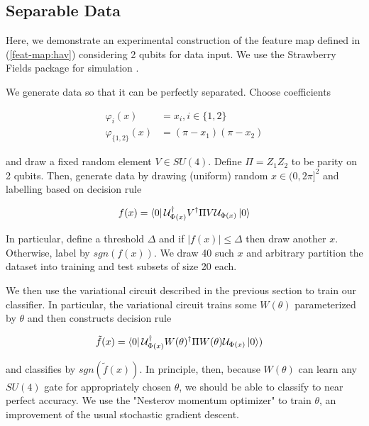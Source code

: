 \documentclass{beamer}
\newcommand\0{\mathbf{0}}
\newcommand\<{\langle}
\renewcommand\>{\rangle}
\renewcommand\phi{\varphi}
\begin{document}
\subsection{Separable Data}

\begin{frame}
Here, we demonstrate an experimental construction of the feature map defined in (\ref{feat-map:hav}) considering 2 qubits for data input. We use the Strawberry Fields package for simulation \cite{killoran2019strawberry}.

We generate data so that it can be perfectly separated. Choose coefficients

\begin{align*}
\phi_{i}(x) &= x_i, i \in \{1, 2\} \\
\phi_{\{1,2\}}(x) &= (\pi - x_1)(\pi - x_2) 
\end{align*}

and draw a fixed random element $V \in SU(4)$. Define $\Pi = Z_1Z_2$ to be parity on 2 qubits. Then, generate data by drawing (uniform) random $x \in (0, 2\pi]^2$ and labelling based on decision rule

\begin{align*}
f(x) = \bra{0} \mathcal{U}_{\Phi(x)}^\dag V^\dag \Pi V \mathcal{U}_{\Phi(x)}\ket{0}	 
\end{align*}

In particular, define a threshold $\Delta$ and if $|f(x)| \leq \Delta$ then draw another $x$. Otherwise, label by $sgn(f(x))$. We draw 40 such $x$ and arbitrary partition the dataset into training and test subsets of size 20 each.
\end{frame}

\begin{frame}
We then use the variational circuit described in the previous section to train our classifier. In particular, the variational circuit trains some $W(\theta)$ parameterized by $\theta$ and then constructs decision rule

\begin{align*}
\tilde{f}(x) &= \bra{0} \mathcal{U}_{\Phi(x)}^\dag W(\theta)^\dag \Pi W(\theta) \mathcal{U}_{\Phi(x)}\ket{0})
\end{align*}
 
and classifies by $sgn(\tilde{f}(x))$. In principle, then, because $W(\theta)$ can learn any $SU(4)$ gate for appropriately chosen $\theta$, we should be able to classify to near perfect accuracy. We use the "Nesterov momentum optimizer" to train $\theta$, an improvement of the usual stochastic gradient descent.
\end{frame}
\end{document}
